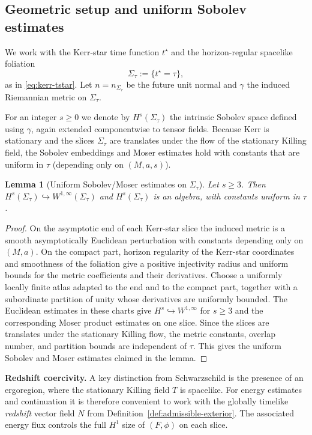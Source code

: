 \documentclass[11pt]{article}
\numberwithin{equation}{section}
\theoremstyle{plain}
\newtheorem{lemma}[theorem]{Lemma}
\theoremstyle{definition}
\theoremstyle{remark}
\begin{document}
\subsection{Geometric setup and uniform Sobolev estimates}\label{app:kerr-setup}

We work with the Kerr-star time function $t^\star$ and the horizon-regular spacelike foliation
\begin{equation}
\Sigma_\tau:=\{t^\star=\tau\},
\end{equation}
as in \eqref{eq:kerr-tstar}.
Let $n=n_{\Sigma_\tau}$ be the future unit normal and $\gamma$ the induced Riemannian metric on $\Sigma_\tau$.

For an integer $s\ge 0$ we denote by $H^s(\Sigma_\tau)$ the intrinsic Sobolev space defined using $\gamma$,
again extended componentwise to tensor fields.
Because Kerr is stationary and the slices $\Sigma_\tau$ are translates under the flow of the stationary Killing field,
the Sobolev embeddings and Moser estimates hold with constants that are uniform in $\tau$ (depending only on $(M,a,s)$).

\begin{lemma}[Uniform Sobolev/Moser estimates on $\Sigma_\tau$]\label{lem:sobolev-algebra-kerr}
Let $s\ge 3$.
Then $H^{s}(\Sigma_\tau)\hookrightarrow W^{1,\infty}(\Sigma_\tau)$ and $H^{s}(\Sigma_\tau)$ is an algebra, with constants uniform in $\tau$.
\end{lemma}

\begin{proof}
On the asymptotic end of each Kerr-star slice the induced metric is a smooth asymptotically Euclidean perturbation with constants depending only on $(M,a)$.  On the compact part, horizon regularity of the Kerr-star coordinates and smoothness of the foliation give a positive injectivity radius and uniform bounds for the metric coefficients and their derivatives.  Choose a uniformly locally finite atlas adapted to the end and to the compact part, together with a subordinate partition of unity whose derivatives are uniformly bounded.  The Euclidean estimates in these charts give $H^s\hookrightarrow W^{1,\infty}$ for $s\ge3$ and the corresponding Moser product estimates on one slice.  Since the slices are translates under the stationary Killing flow, the metric constants, overlap number, and partition bounds are independent of $\tau$.  This gives the uniform Sobolev and Moser estimates claimed in the lemma.
\end{proof}

\medskip
\noindent\textbf{Redshift coercivity.}
A key distinction from Schwarzschild is the presence of an ergoregion, where the stationary Killing field $T$ is spacelike.
For energy estimates and continuation it is therefore convenient to work with the globally timelike \emph{redshift} vector field $N$
from Definition~\ref{def:admissible-exterior}.
The associated energy flux controls the full $H^1$ size of $(F,\phi)$ on each slice.
\end{document}
